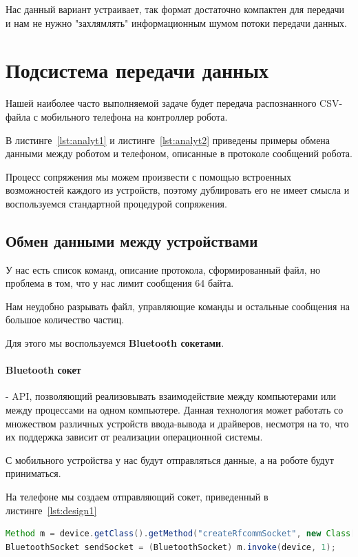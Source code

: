 Нас данный вариант устраивает, так формат достаточно компактен для передачи и нам не нужно "захлямлять" информационным шумом потоки передачи данных. 

\section{Подсистема передачи данных}

Нашей наиболее часто выполняемой задаче будет передача распознанного CSV-файла с мобильного телефона на контроллер робота.

В листинге~\ref{lst:analyt1} и листинге~\ref{lst:analyt2} приведены примеры обмена данными между роботом и телефоном, описанные в протоколе сообщений робота.

Процесс сопряжения мы можем произвести с помощью встроенных возможностей каждого из устройств, поэтому дублировать его не имеет смысла и воспользуемся стандартной процедурой сопряжения.

\subsection{Обмен данными между устройствами}

У нас есть список команд, описание протокола, сформированный файл, но проблема в том, что у нас лимит сообщения 64 байта.

Нам неудобно разрывать файл, управляющие команды и остальные сообщения на большое количество частиц.

Для этого мы воспользуемся \textbf{Bluetooth сокетами}.

\paragraph{Bluetooth сокет} -  API, позволяющий реализовывать взаимодействие между компьютерами или между процессами на одном компьютере. Данная технология может работать со множеством различных устройств ввода-вывода и драйверов, несмотря на то, что их поддержка зависит от реализации операционной системы.

С мобильного устройства у нас будут отправляться данные, а на роботе будут приниматься.

На телефоне мы создаем отправляющий сокет, приведенный в листинге~\ref{lst:design1} 

\begin{lstlisting}[caption={Создаем сокет с данными для отправки}, label=lst:design1, language=Java]
Method m = device.getClass().getMethod("createRfcommSocket", new Class[] { int.class }); 
BluetoothSocket sendSocket = (BluetoothSocket) m.invoke(device, 1);
\end{lstlisting}

